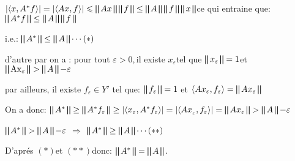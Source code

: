 \documentclass{article}
\begin{document}
$| \langle x, A^{\ast} f \rangle | = | \langle A x, f \rangle | \leqslant
\bigparallel A x \bigparallel \bigparallel f \bigparallel \leq \bigparallel A
\bigparallel \bigparallel f \bigparallel \bigparallel x \bigparallel$ce qui
entraine que:$\bigparallel A^{\ast} f \bigparallel \leq \bigparallel A
\bigparallel \bigparallel f \bigparallel$

i.e.: $\bigparallel A^{\ast} \bigparallel \leq \bigparallel A \bigparallel
\cdots (\ast)$

d'autre par on a : pour tout $\varepsilon > 0,$il existe $x_{\varepsilon} $tel
que $\bigparallel x_{\varepsilon} \bigparallel = 1$et $\bigparallel
\ensuremath{\operatorname{Ax}}_{\varepsilon} \bigparallel > \bigparallel A
\bigparallel - \varepsilon$

par ailleurs, il existe $f_{\varepsilon} \in Y'$ tel que: $\bigparallel
f_{\varepsilon} \bigparallel = 1$ et $\langle A x_{\varepsilon},
f_{\varepsilon} \rangle = \bigparallel A x_{\varepsilon} \bigparallel$

On a donc: $\bigparallel A^{\ast} \bigparallel \geq \bigparallel A^{\ast}
f_{\varepsilon} \bigparallel \geq | \langle x_{\varepsilon}, A^{\ast}
f_{\varepsilon} \rangle | = | \langle A x_{_{\varepsilon}}, f_{\varepsilon}
\rangle | = \bigparallel A x_{\varepsilon} \bigparallel > \bigparallel A
\bigparallel - \varepsilon$

$\bigparallel A^{\ast} \bigparallel > \bigparallel A \bigparallel -
\varepsilon$ $\Rightarrow$ $\bigparallel A^{\ast} \bigparallel \geq
\bigparallel A \bigparallel \cdots (\ast \ast)$

D'apr{\'e}s $(\ast) $et $(\ast \ast) $donc: $\bigparallel A^{\ast}
\bigparallel = \bigparallel A \bigparallel .$

\

{\hspace{8em}}{\hspace{1pt   }}{\hspace{39em}}

\
\end{document}
